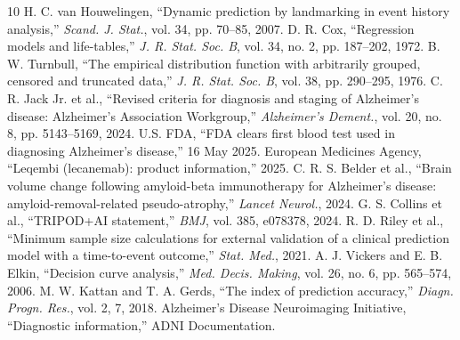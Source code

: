 \documentclass[conference]{IEEEtran}
\begin{document}
\begin{thebibliography}{10}\footnotesize
{} H. C. van Houwelingen, ``Dynamic prediction by landmarking in event history analysis,'' \emph{Scand. J. Stat.}, vol. 34, pp. 70--85, 2007.
 D. R. Cox, ``Regression models and life-tables,'' \emph{J. R. Stat. Soc. B}, vol. 34, no. 2, pp. 187--202, 1972.
 B. W. Turnbull, ``The empirical distribution function with arbitrarily grouped, censored and truncated data,'' \emph{J. R. Stat. Soc. B}, vol. 38, pp. 290--295, 1976.
 C. R. Jack Jr. et al., ``Revised criteria for diagnosis and staging of Alzheimer's disease: Alzheimer's Association Workgroup,'' \emph{Alzheimer's Dement.}, vol. 20, no. 8, pp. 5143--5169, 2024.
 U.S. FDA, ``FDA clears first blood test used in diagnosing Alzheimer's disease,'' 16 May 2025.
 European Medicines Agency, ``Leqembi (lecanemab): product information,'' 2025.
 C. R. S. Belder et al., ``Brain volume change following amyloid-beta immunotherapy for Alzheimer's disease: amyloid-removal-related pseudo-atrophy,'' \emph{Lancet Neurol.}, 2024.
 G. S. Collins et al., ``TRIPOD+AI statement,'' \emph{BMJ}, vol. 385, e078378, 2024.
 R. D. Riley et al., ``Minimum sample size calculations for external validation of a clinical prediction model with a time-to-event outcome,'' \emph{Stat. Med.}, 2021.
 A. J. Vickers and E. B. Elkin, ``Decision curve analysis,'' \emph{Med. Decis. Making}, vol. 26, no. 6, pp. 565--574, 2006.
 M. W. Kattan and T. A. Gerds, ``The index of prediction accuracy,'' \emph{Diagn. Progn. Res.}, vol. 2, 7, 2018.
 Alzheimer's Disease Neuroimaging Initiative, ``Diagnostic information,'' ADNI Documentation.
\end{thebibliography}
\end{document}
